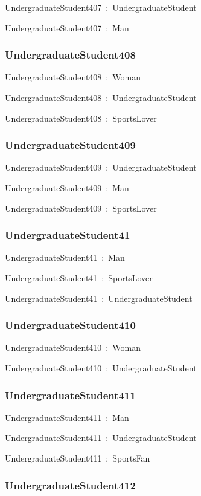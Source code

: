 \documentclass{article}
\begin{document}
UndergraduateStudent407~:~UndergraduateStudent

UndergraduateStudent407~:~Man

\subsubsection*{UndergraduateStudent408}

UndergraduateStudent408~:~Woman

UndergraduateStudent408~:~UndergraduateStudent

UndergraduateStudent408~:~SportsLover

\subsubsection*{UndergraduateStudent409}

UndergraduateStudent409~:~UndergraduateStudent

UndergraduateStudent409~:~Man

UndergraduateStudent409~:~SportsLover

\subsubsection*{UndergraduateStudent41}

UndergraduateStudent41~:~Man

UndergraduateStudent41~:~SportsLover

UndergraduateStudent41~:~UndergraduateStudent

\subsubsection*{UndergraduateStudent410}

UndergraduateStudent410~:~Woman

UndergraduateStudent410~:~UndergraduateStudent

\subsubsection*{UndergraduateStudent411}

UndergraduateStudent411~:~Man

UndergraduateStudent411~:~UndergraduateStudent

UndergraduateStudent411~:~SportsFan

\subsubsection*{UndergraduateStudent412}
\end{document}
